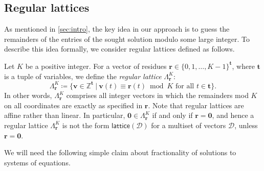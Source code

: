 \documentclass{theoretics}
\newcommand{\Dd}{\mathcal{D}}
\newcommand{\Z}{\mathbb{Z}}
\newcommand{\tup}[1]{{\mathbf{#1}}}
\newcommand{\tv}{\tup t}
\newcommand{\rr}{\tup r}
\newcommand{\myvv}{\tup v} %
\newcommand{\zero}{\tup 0}
\newcommand{\lattice}{\mathsf{lattice}}
\begin{document}
\subsection{Regular lattices}

As mentioned in \cref{sec:intro}, the key idea in our approach is to guess the remainders of the entries of the sought solution modulo some large integer. To describe this idea formally, we consider regular lattices defined as follows.

Let $K$ be a positive integer. For a vector of residues $\rr\in \{0,1,\ldots,K-1\}^\tv$, where $\tv$ is a tuple of variables, we define the {\em{regular lattice}} $\Lambda^K_{\rr}$:
$$\Lambda^K_{\rr}\coloneqq \{\myvv\in \Z^{\tv}~|~\myvv(t)\equiv \rr(t)\bmod K\textrm{ for all }t\in \tv\}.$$
In other words, $\Lambda^K_\rr$ comprises all integer vectors in which the remainders mod $K$ on all coordinates are exactly as specified in $\rr$. Note that regular lattices are affine rather than linear. In particular, $\zero\in \Lambda^K_\rr$ if and only if $\rr=\zero$, and hence a regular lattice $\Lambda^K_\rr$ is not the form $\lattice(\Dd)$ for a multiset of vectors $\Dd$, unless $\rr=\zero$.

We will need the following simple claim about fractionality of solutions to systems of equations.
\end{document}
